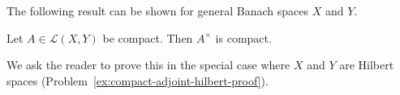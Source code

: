 The following result can be shown for general Banach spaces $X$ and $Y$.

\begin{Theorem}
\label{thm:compact-operator-adjoint-compact}
Let $A\in\mathcal{L}(X,Y)$ be compact. Then $A^\times$ is compact.
\end{Theorem}

We ask the reader to prove this in the special case where $X$ and $Y$ are Hilbert spaces (Problem~\ref{ex:compact-adjoint-hilbert-proof}).
